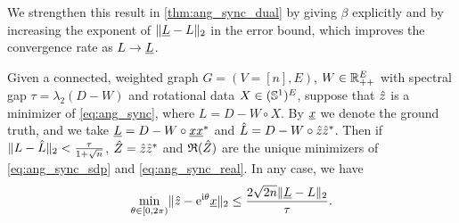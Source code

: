 We strengthen this result in \cref{thm:ang_sync_dual} by giving $\beta$ explicitly and by increasing the exponent of $\lVert \underline{L} - L \rVert_2$ in the error bound, which improves the convergence rate as $L \to \underline{L}$.
\medskip
\begin{theorem} \label{thm:ang_sync_dual}
  Given a connected, weighted graph $G = (V = [n], E)$, $W \in \mathbb{R}_{++}^E$ with spectral gap $\tau = \lambda_2(D - W)$ and rotational data $X \in (\mathbb{S}^1)^E$, suppose that $\hat{z}$ is a minimizer of \eqref{eq:ang_sync}, where $L = D - W \circ X$.  By $\underline{x}$ we denote the ground truth, and we take $\underline{L} = D - W \circ \underline{x} \underline{x}^*$ and $\hat{L} = D - W \circ \hat{z} \hat{z}^*$.  Then if $\lVert L - \hat{L} \rVert_2 < \frac{\tau}{1 + \sqrt{n}}$, $\hat{Z} = \hat{z} \hat{z}^*$ and $\mathfrak{R}(\hat{Z})$ are the unique minimizers of \eqref{eq:ang_sync_sdp} and \eqref{eq:ang_sync_real}.  In any case, we have \begin{equation} \min_{\theta \in [0, 2\pi)} \lVert \hat{z} - \mathrm{e}^{\mathrm{i} \theta} \underline{x} \rVert_2 \le \dfrac{2 \sqrt{2 n} \lVert\underline{L} - L\rVert_2}{\tau}.\label{eq:ang_sync_bound}\end{equation}
\end{theorem}


